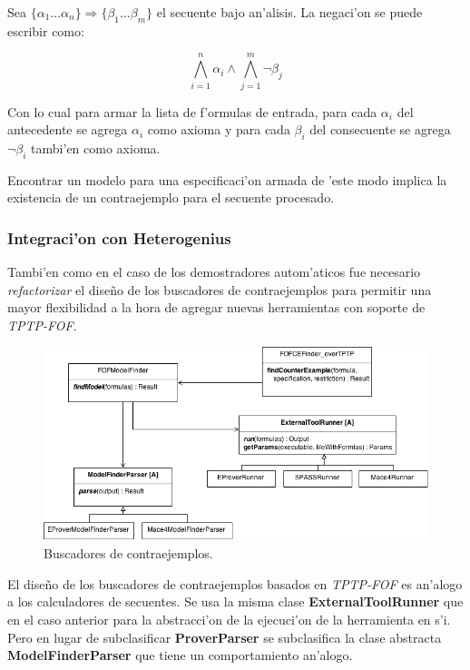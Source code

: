 Sea $\{\alpha_1 \dots \alpha_n\} \Rightarrow \{\beta_1 \dots \beta_m\}$ el secuente bajo an'alisis.
La negaci'on se puede escribir como:

\begin{equation}
\bigwedge\limits_{i=1}^n{\alpha_i} \wedge \bigwedge\limits_{j=1}^m{\neg \beta_{j}}
\end{equation}

Con lo cual para armar la lista de f'ormulas de entrada, para cada $\alpha_{i}$ del antecedente se agrega $\alpha_{i}$ como axioma y para cada $\beta_{i}$ del consecuente se agrega $\neg \beta_{i}$ tambi'en como axioma.

Encontrar un modelo para una especificaci'on armada de 'este modo implica la existencia de un contraejemplo para el secuente procesado.


\subsubsection{Integraci'on con Heterogenius}

Tambi'en como en el caso de los demostradores autom'aticos fue necesario \textit{refactorizar} el diseño de los buscadores de contraejemplos para permitir una mayor flexibilidad a la hora de agregar nuevas herramientas con soporte de \textit{TPTP-FOF}.

\begin{figure}[H]
	\includegraphics[width=450px, angle=90]{img/arq_ce.png}
	\centering
	\caption{Buscadores de contraejemplos.}
\end{figure}

El diseño de los buscadores de contraejemplos basados en \textit{TPTP-FOF} es an'alogo a los calculadores de secuentes. Se usa la misma clase \textbf{ExternalToolRunner} que en el caso anterior para la abstracci'on de la ejecuci'on de la herramienta en s'i. Pero en lugar de subclasificar \textbf{ProverParser} se subclasifica la clase abstracta \textbf{ModelFinderParser} que tiene un comportamiento an'alogo.